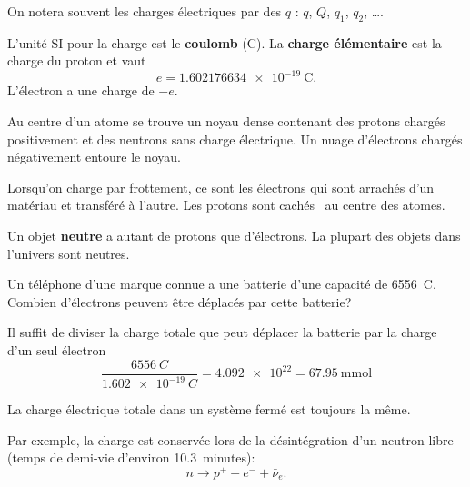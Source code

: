 On notera souvent les charges électriques par des $q$ : $q$, $Q$, $q_1$, $q_2$,
\ldots.

L'unité SI pour la charge est le \textbf{coulomb} (C). La \textbf{charge
élémentaire} est la charge du proton et vaut
$$e = \SI{1.602 176 634e-19}{\coulomb}.$$
L'électron a une charge de $-e$.

\begin{fondamentalbox}
  Au centre d'un atome se trouve un noyau dense contenant des protons chargés
  positivement et des neutrons sans charge électrique. Un nuage d'électrons
  chargés négativement entoure le noyau.
\end{fondamentalbox}

Lorsqu'on charge par frottement, ce sont les électrons qui sont arrachés d'un
matériau et transféré à l'autre. Les protons sont \og cachés \fg\ au centre des
atomes.

Un objet \textbf{neutre} a autant de protons que d'électrons. La plupart des
objets dans l'univers sont neutres.


\begin{diapobox}

  Un téléphone d'une marque connue a une batterie d'une capacité de
  \SI{6556}{C}.  Combien d'électrons peuvent être déplacés par cette batterie?

\end{diapobox}

\begin{reponsebox}
  Il suffit de diviser la charge totale que peut déplacer la batterie par la
  charge d'un seul électron
  \[
    \frac{\SI{6556}{C}}{\SI{1.602e-19}{C}} = \num{4.092e22} =
      \SI{67.95}{\milli\mole}
  \]
\end{reponsebox}


\begin{fondamentalbox}
  La charge électrique totale dans un système fermé est toujours la même.
\end{fondamentalbox}

Par exemple, la charge est conservée lors de la désintégration d'un neutron
libre (temps de demi-vie d'environ \SI{10.3}{minutes}):
\[ n \rightarrow p^+ + e^- + \bar{\nu}_e. \]


